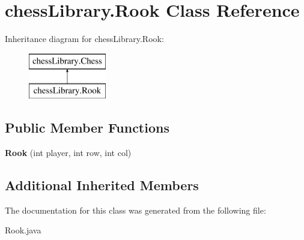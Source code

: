 \hypertarget{classchess_library_1_1_rook}{}\section{chess\+Library.\+Rook Class Reference}
\label{classchess_library_1_1_rook}
Inheritance diagram for chess\+Library.\+Rook\+:\begin{figure}[H]
\begin{center}
\leavevmode
\includegraphics[height=2.000000cm]{classchess_library_1_1_rook}
\end{center}
\end{figure}
\subsection*{Public Member Functions}
\begin{DoxyCompactItemize}
\item 
\mbox{\label{classchess_library_1_1_rook_a601989e504c3e3b63baa33da70fca8b5}} 
{\bfseries Rook} (int player, int row, int col)
\end{DoxyCompactItemize}
\subsection*{Additional Inherited Members}


The documentation for this class was generated from the following file\+:\begin{DoxyCompactItemize}
\item 
Rook.\+java\end{DoxyCompactItemize}
